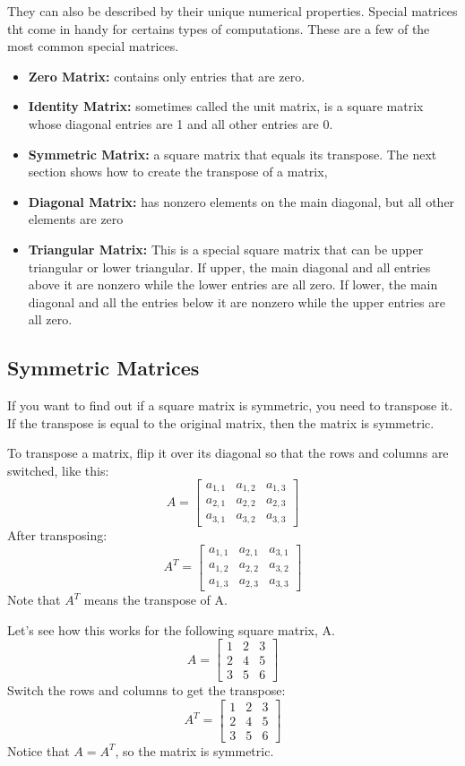 They can also be described by their unique numerical properties. Special matrices tht come in handy for certains types of computations. These are a few of the most common special matrices.
\begin{itemize}
	\item \textbf{Zero Matrix:} contains only entries that are zero.
	\item \textbf{Identity Matrix:} sometimes called the unit matrix, is a square matrix whose diagonal entries are 1 and all other entries are 0.
	\item \textbf{Symmetric Matrix:} a square matrix that equals its transpose. The next section shows how to create the transpose of a matrix,
	\item \textbf{Diagonal Matrix:} has nonzero elements on the main diagonal, but all other elements are zero
	\item \textbf{Triangular Matrix:} This is a special square matrix that can be upper triangular or lower triangular. If upper, the main diagonal and all entries above it are nonzero while the lower entries are all zero. If lower, the main diagonal and all the entries below it are nonzero while the upper entries are all zero. 
\end{itemize}

\subsection{Symmetric Matrices}
If you want to find out if a square matrix is symmetric, you need to transpose it. If the transpose is equal to the original matrix, then the matrix is symmetric.

To transpose a matrix, flip it over its diagonal so that the rows and columns are switched, like this:
$$
A = \begin{bmatrix}
a_{1,1} & a_{1,2} & a_{1,3} \\
a_{2,1} & a_{2,2} & a_{2,3} \\
a_{3,1} & a_{3,2} & a_{3,3}
\end{bmatrix}
$$
After transposing:
$$
A^T = \begin{bmatrix}
a_{1,1} & a_{2,1} & a_{3,1} \\
a_{1,2} & a_{2,2} & a_{3,2} \\
a_{1,3} & a_{2,3} & a_{3,3}
\end{bmatrix}
$$
Note that $A^T$ means the transpose of A. 

Let's see how this works for the following square matrix, A.
$$
A = \begin{bmatrix}
1 & 2 & 3 \\
2 & 4 & 5 \\
3 & 5 & 6
\end{bmatrix}
$$
Switch the rows and columns to get the transpose:
$$
A^T = \begin{bmatrix}
1 & 2 & 3 \\
2 & 4 & 5 \\
3 & 5 & 6
\end{bmatrix}
$$
Notice that $A = A^T$, so the matrix is symmetric.

